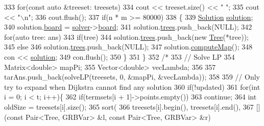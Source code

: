 \begin{DoxyCode}
333             \textcolor{keywordflow}{for}(\textcolor{keyword}{const} \textcolor{keyword}{auto} &treeset: treesets)
334                 cout << treeset.size() << \textcolor{stringliteral}{" "};
335             cout << \textcolor{stringliteral}{"\(\backslash\)n"};
336             cout.flush();
337             \textcolor{keywordflow}{if}(n * m >= 80000)
338             \{
339                 \hyperlink{classSolution}{Solution} \hyperlink{classes_8txt_aa43d5190bbc491d9c9134146e01a248e}{solution};
340                 solution.\hyperlink{classSolution_ac4f88cd3aa0713e8900f33eb9f1f15bf}{board} = \hyperlink{classSolveStrategy_a94d43c47305176d0d3858697d3410443}{solver}->\hyperlink{classSolver_a8966a22c2f247addc8ce453d119bc54e}{board};
341                 solution.\hyperlink{classSolution_a554205b5c578add14d2d7836042215d8}{trees}.push\_back(NULL);
342                 \textcolor{keywordflow}{for}(\textcolor{keyword}{auto} tree: ans)
343                     \textcolor{keywordflow}{if}(tree)
344                         solution.\hyperlink{classSolution_a554205b5c578add14d2d7836042215d8}{trees}.push\_back(\textcolor{keyword}{new} \hyperlink{classTree}{Tree}(*tree));
345                     \textcolor{keywordflow}{else}
346                         solution.\hyperlink{classSolution_a554205b5c578add14d2d7836042215d8}{trees}.push\_back(NULL);
347                 solution.\hyperlink{classSolution_a45e5ef985917b725347a0742fe887400}{computeMap}();
348                 con << \hyperlink{classes_8txt_aa43d5190bbc491d9c9134146e01a248e}{solution};
349                 con.flush();
350             \}
351         \}
352         \textcolor{comment}{/*}
353 \textcolor{comment}{        // Solve LP}
354 \textcolor{comment}{        Matrix<double> mapPi;}
355 \textcolor{comment}{        Vector<double> vecLambda;}
356 \textcolor{comment}{        }
357 \textcolor{comment}{        tarAns.push\_back(solveLP(treesets, 0, &mapPi, &vecLambda));}
358 \textcolor{comment}{        }
359 \textcolor{comment}{        // Only try to expand when Dijkstra cannot find any solution}
360 \textcolor{comment}{        if(!updated)}
361 \textcolor{comment}{            for(int i = 0; i < t; i++)\{}
362 \textcolor{comment}{                if(termsets[i + 1]->points.empty())}
363 \textcolor{comment}{                    continue;}
364 \textcolor{comment}{                int oldSize = treesets[i].size();}
365 \textcolor{comment}{                sort(}
366 \textcolor{comment}{                    treesets[i].begin(), treesets[i].end(),}
367 \textcolor{comment}{                    [](const Pair<Tree, GRBVar> &l, const Pair<Tree, GRBVar> &r)}

\end{DoxyCode}
